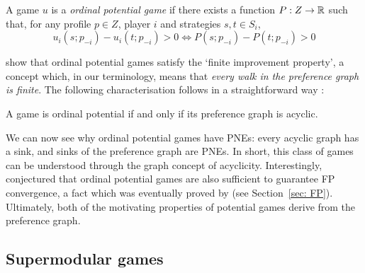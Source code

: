 \documentclass[preprint,authoryear]{elsarticle}
\begin{document}
\begin{defn}
    A game $u$ is a \emph{ordinal potential game} if there exists a function $P: Z \to \mathbb{R}$ such that, for any profile $p\in Z$, player $i$ and strategies $s,t\in S_i$,
    \begin{equation}
        u_i(s; p_{-i}) - u_i(t;p_{-i}) > 0 \Leftrightarrow P(s; p_{-i}) - P(t;p_{-i}) > 0
    \end{equation}
\end{defn}
\cite{monderer_potential_1996} show that ordinal potential games satisfy the `finite improvement property', a concept which, in our terminology, means that \emph{every walk in the preference graph is finite}. The following characterisation follows in a straightforward way \citep{biggar_graph_2023}:
\begin{thm}
    A game is ordinal potential if and only if its preference graph is acyclic.
\end{thm}


We can now see why ordinal potential games have PNEs: every acyclic graph has a sink, and sinks of the preference graph are PNEs. In short, this class of games can be understood through the graph concept of acyclicity. Interestingly, \citeauthor{monderer_fictitious_1996} conjectured that ordinal potential games are also sufficient to guarantee FP convergence, a fact which was eventually proved by \cite{berger_two_2007,berger_browns_2007} (see Section~\ref{sec: FP}). Ultimately, both of the motivating properties of potential games derive from the preference graph.

\subsection{Supermodular games} \label{sec:supermodular}
\end{document}
